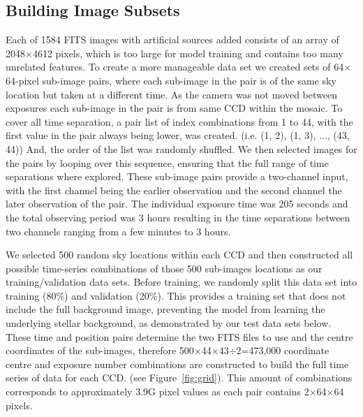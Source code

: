 \documentclass{aastex631}
\begin{document}
\subsection{Building Image Subsets}
\label{subsect:subsets}
Each of 1584 FITS images with artificial sources added consists of an array of 2048$\times$4612 pixels, which is too large for model training and contains too many unrelated features.  
To create a more manageable data set we created sets of 64$\times$64-pixel sub-image pairs, where each sub-image in the pair is of the same sky location but taken at a different time.
As the camera was not moved between exposures each sub-image in the pair is from same CCD within the mosaic.
To cover all time separation, a pair list of index combinations from 1 to 44, with the first value in the pair always being lower, was created. (i.e. (1, 2), (1, 3), ..., (43, 44))
And, the order of the list was randomly shuffled.
We then selected images for the pairs by looping over this sequence, ensuring that the full range of time separations where  explored.
These sub-image pairs provide a two-channel input, with the first channel being the earlier observation and the second channel the later observation of the pair. 
The individual exposure time was 205 seconds and the total observing period was 3 hours resulting in the time separations between two channels ranging from a few minutes to 3 hours. 

We selected 500 random sky locations within each CCD and then constructed all possible time-series combinations of those 500 sub-images locations as our training/validation data sets.
Before training, we randomly split this data set into training (80\%) and validation (20\%).
This provides a training set that does not include the full background image, preventing the model from learning the underlying stellar background, as demonstrated by our test data sets below.
These time and position pairs determine the two FITS files to use and the centre coordinates of the sub-images, therefore 500$\times$44$\times$43$\div2$=473,000 coordinate centre and exposure number combinations are constructed to build the full time series of data for each CCD. (see Figure~\ref{fig:grid}).
This amount of combinations corresponds to approximately 3.9G pixel values as each pair contains 2$\times$64$\times$64 pixels.
\end{document}
